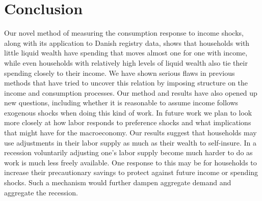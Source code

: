 \section{Conclusion}
Our novel method of measuring the consumption response to income shocks, along with its application to Danish registry data, shows that households with little liquid wealth have spending that moves almost one for one with income, while even households with relatively high levels of liquid wealth also tie their spending closely to their income. We have shown serious flaws in previous methods that have tried to uncover this relation by imposing structure on the income and consumption processes. Our method and results have also opened up new questions, including whether it is reasonable to assume income follows exogenous shocks when doing this kind of work. In future work we plan to look more closely at how labor responds to preference shocks and what implications that might have for the macroeconomy. Our results suggest that households may use adjustments in their labor supply as much as their wealth to self-insure. In a recession voluntarily adjusting one's labor supply become much harder to do as work is much less freely available. One response to this may be for households to increase their precautionary savings to protect against future income or spending shocks. Such a mechanism would further dampen aggregate demand and aggregate the recession.
